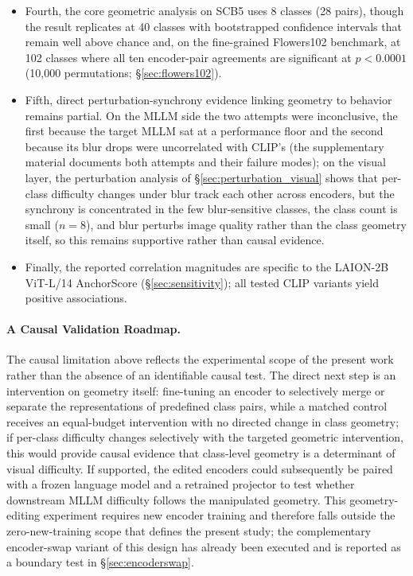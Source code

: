 \documentclass[a4paper,fleqn]{cas-sc}
\begin{document}
\begin{itemize}
  \item Fourth, the core geometric analysis on SCB5 uses 8 classes (28 pairs), though the result replicates at 40 classes with bootstrapped confidence intervals that remain well above chance and, on the fine-grained Flowers102 benchmark, at 102 classes where all ten encoder-pair agreements are significant at $p<0.0001$ (10{,}000 permutations; \S\ref{sec:flowers102}).
  \item Fifth, direct perturbation-synchrony evidence linking geometry to behavior remains partial. On the MLLM side the two attempts were inconclusive, the first because the target MLLM sat at a performance floor and the second because its blur drops were uncorrelated with CLIP's (the supplementary material documents both attempts and their failure modes); on the visual layer, the perturbation analysis of \S\ref{sec:perturbation_visual} shows that per-class difficulty changes under blur track each other across encoders, but the synchrony is concentrated in the few blur-sensitive classes, the class count is small ($n=8$), and blur perturbs image quality rather than the class geometry itself, so this remains supportive rather than causal evidence.
  \item Finally, the reported correlation magnitudes are specific to the LAION-2B ViT-L/14 AnchorScore (\S\ref{sec:sensitivity}); all tested CLIP variants yield positive associations.
\end{itemize}

\paragraph{A Causal Validation Roadmap.}
The causal limitation above reflects the experimental scope of the present work rather than the absence of an identifiable causal test. The direct next step is an intervention on geometry itself: fine-tuning an encoder to selectively merge or separate the representations of predefined class pairs, while a matched control receives an equal-budget intervention with no directed change in class geometry; if per-class difficulty changes selectively with the targeted geometric intervention, this would provide causal evidence that class-level geometry is a determinant of visual difficulty. If supported, the edited encoders could subsequently be paired with a frozen language model and a retrained projector to test whether downstream MLLM difficulty follows the manipulated geometry. This geometry-editing experiment requires new encoder training and therefore falls outside the zero-new-training scope that defines the present study; the complementary encoder-swap variant of this design has already been executed and is reported as a boundary test in \S\ref{sec:encoderswap}.
\end{document}
